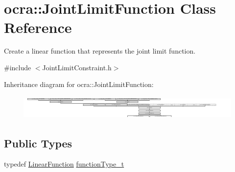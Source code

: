 \hypertarget{classocra_1_1JointLimitFunction}{}\section{ocra\+:\+:Joint\+Limit\+Function Class Reference}
\label{classocra_1_1JointLimitFunction}


Create a linear function that represents the joint limit function.  




{\ttfamily \#include $<$Joint\+Limit\+Constraint.\+h$>$}

Inheritance diagram for ocra\+:\+:Joint\+Limit\+Function\+:\begin{figure}[H]
\begin{center}
\leavevmode
\includegraphics[height=1.262480cm]{df/de0/classocra_1_1JointLimitFunction}
\end{center}
\end{figure}
\subsection*{Public Types}
\begin{DoxyCompactItemize}
\item 
typedef \hyperlink{classocra_1_1LinearFunction}{Linear\+Function} \hyperlink{classocra_1_1JointLimitFunction_af300f2c709840b94759c445130ec9a18}{function\+Type\+\_\+t}
\end{DoxyCompactItemize}

